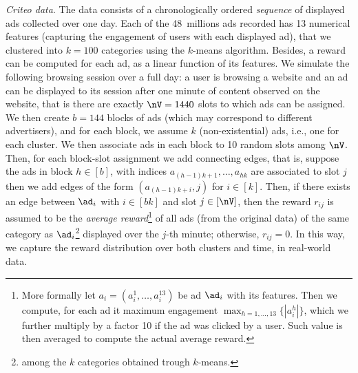 \smallskip
\noindent
\emph{Criteo data}. 
The data consists of a chronologically ordered \emph{sequence} of displayed ads collected over one day. 
Each of the 48~millions ads recorded has 13 numerical features (capturing the engagement of users with each displayed ad),
that we clustered into $k=100$ categories using the $k$-means algorithm. 
Besides, a reward can be computed for each ad, as a linear function of its features. %
We simulate the following browsing session over a full day: 
a user is browsing a website and an ad can be displayed to its session after one minute of content observed on the website, 
that is there are exactly $\nV=1440$ slots to which ads can be assigned.
We then create $b=144$ blocks of ads (which may correspond to different advertisers), and
for each block, we assume $k$ (non-existential) ads, i.e., one for each cluster.
We then associate ads in each block to 10 random slots among $\nV$.
Then, for each block-slot assignment we add connecting edges, that is, suppose the ads in block $h\in[b]$, with indices $a_{(h-1)k+1},\dots,a_{hk}$ are associated to slot $j$ then we add edges of the form $(a_{(h-1)k+i}, j)$ for $i\in[k]$. Then,
if there exists an edge between $\ad_i$ with $i \in [bk]$ and slot $j \in [\nV]$,
then the reward $r_{ij}$ %
is assumed to be the \emph{average reward}\footnote{More formally let $a_i=(a_i^1,\dots,a_i^{13})$ be ad $\ad_i$ with its features. Then we compute, for each ad it maximum engagement $\max_{h=1,\dots,13} \{|a_i^h|\}$, which we further multiply by a factor 10 if the ad was clicked by a user. Such value is then averaged to compute the actual average reward.} of all ads (from the original data) of the same category as $\ad_i$\footnote{among the $k$ categories obtained trough $k$-means.} displayed over the $j$-th minute; 
otherwise, $r_{ij} = 0$.
In this way, we capture the reward distribution over both clusters and time, in real-world data.
